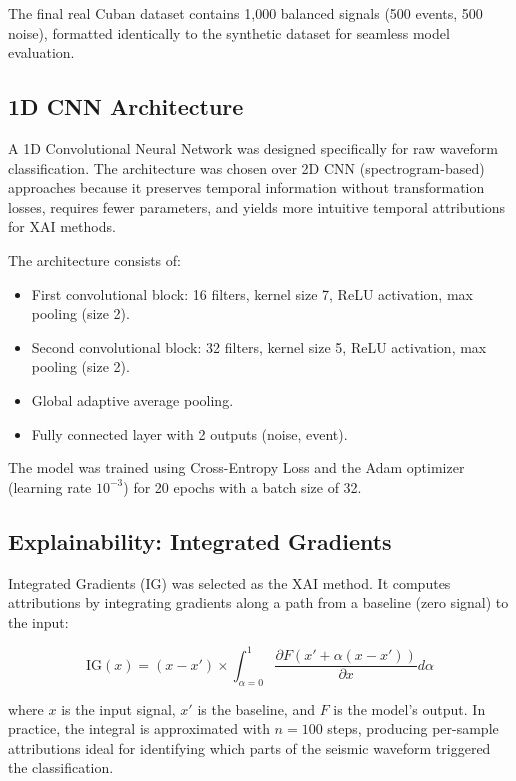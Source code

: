 \documentclass[10pt,a4paper]{article}
\begin{document}
The final real Cuban dataset contains 1,000 balanced signals (500 events, 500 noise), formatted identically to the synthetic dataset for seamless model evaluation.

\subsection{1D CNN Architecture}

A 1D Convolutional Neural Network was designed specifically for raw waveform classification. The architecture was chosen over 2D CNN (spectrogram-based) approaches because it preserves temporal information without transformation losses, requires fewer parameters, and yields more intuitive temporal attributions for XAI methods.

The architecture consists of:
\begin{itemize}
\item First convolutional block: 16 filters, kernel size 7, ReLU activation, max pooling (size 2).
\item Second convolutional block: 32 filters, kernel size 5, ReLU activation, max pooling (size 2).
\item Global adaptive average pooling.
\item Fully connected layer with 2 outputs (noise, event).
\end{itemize}

The model was trained using Cross-Entropy Loss and the Adam optimizer (learning rate $10^{-3}$) for 20 epochs with a batch size of 32.

\subsection{Explainability: Integrated Gradients}

Integrated Gradients (IG) \cite{sundararajan2017axiomatic} was selected as the XAI method. It computes attributions by integrating gradients along a path from a baseline (zero signal) to the input:

\begin{equation}
\text{IG}(x) = (x - x') \times \int_{\alpha=0}^{1} \frac{\partial F(x' + \alpha(x - x'))}{\partial x} d\alpha
\end{equation}

where $x$ is the input signal, $x'$ is the baseline, and $F$ is the model's output. In practice, the integral is approximated with $n=100$ steps, producing per-sample attributions ideal for identifying which parts of the seismic waveform triggered the classification.
\end{document}
